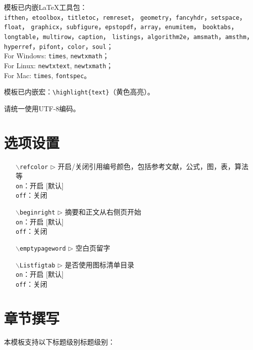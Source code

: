 \setlength{\hangindent}{4em}
模板已内嵌LaTeX工具包：\\
{\tt ifthen}，{\tt etoolbox}，{\tt titletoc}，{\tt remreset}，
{\tt geometry}，{\tt fancyhdr}，{\tt setspace}，{\tt float}，
{\tt graphicx}，{\tt subfigure}，{\tt epstopdf}，{\tt array}，{\tt enumitem}，
{\tt booktabs}，{\tt longtable}，{\tt multirow}，{\tt caption}，
{\tt listings}，{\tt algorithm2e}，{\tt amsmath}，{\tt amsthm}，
{\tt hyperref}，{\tt pifont}，{\tt color}，{\tt soul}；\\
For Windows: {\tt times}, {\tt newtxmath}；\\
For Linux: {\tt newtxtext}, {\tt newtxmath}；\\
For Mac: {\tt times}, {\tt fontspec}。


模板已内嵌宏：\verb|\highlight{text}|（黄色高亮）。

请统一使用UTF-8编码。



\section{选项设置}

\begin{itemize}[leftmargin=3cm]
  \item[{\tt  $\backslash$refcolor} $\triangleright$]  开启/关闭引用编号颜色，包括参考文献，公式，图，表，算法等\\
  \texttt{on}：开启 [默认]\\
  \texttt{off}：关闭
  \item[{\tt $\backslash$beginright} $\triangleright$]  摘要和正文从右侧页开始\\
  \texttt{on}：开启 [默认]\\
  \texttt{off}：关闭
  \item[{\tt $\backslash$emptypageword} $\triangleright$]  空白页留字
  \item[{\tt $\backslash$Listfigtab} $\triangleright$]  是否使用图标清单目录\\
  \texttt{on}：开启 [默认]\\
  \texttt{off}：关闭
\end{itemize}


\section{章节撰写}
本模板支持以下标题级别标题级别：

